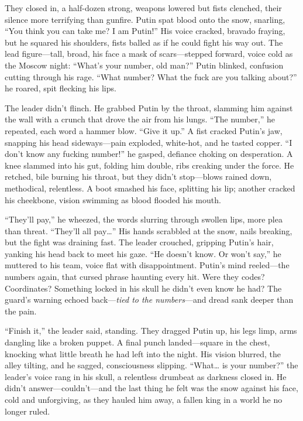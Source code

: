 \documentclass[12pt]{book}
\begin{document}
They closed in, a half-dozen strong, weapons lowered but fists clenched, their silence more terrifying than gunfire. Putin spat blood onto the snow, snarling, “You think you can take me? I am Putin!” His voice cracked, bravado fraying, but he squared his shoulders, fists balled as if he could fight his way out. The lead figure—tall, broad, his face a mask of scars—stepped forward, voice cold as the Moscow night: “What’s your number, old man?” Putin blinked, confusion cutting through his rage. “What number? What the fuck are you talking about?” he roared, spit flecking his lips.

The leader didn’t flinch. He grabbed Putin by the throat, slamming him against the wall with a crunch that drove the air from his lungs. “The number,” he repeated, each word a hammer blow. “Give it up.” A fist cracked Putin’s jaw, snapping his head sideways—pain exploded, white-hot, and he tasted copper. “I don’t know any fucking number!” he gasped, defiance choking on desperation. A knee slammed into his gut, folding him double, ribs creaking under the force. He retched, bile burning his throat, but they didn’t stop—blows rained down, methodical, relentless. A boot smashed his face, splitting his lip; another cracked his cheekbone, vision swimming as blood flooded his mouth.

“They’ll pay,” he wheezed, the words slurring through swollen lips, more plea than threat. “They’ll all pay…” His hands scrabbled at the snow, nails breaking, but the fight was draining fast. The leader crouched, gripping Putin’s hair, yanking his head back to meet his gaze. “He doesn’t know. Or won’t say,” he muttered to his team, voice flat with disappointment. Putin’s mind reeled—the numbers again, that cursed phrase haunting every hit. Were they codes? Coordinates? Something locked in his skull he didn’t even know he had? The guard’s warning echoed back—\textit{tied to the numbers}—and dread sank deeper than the pain.

“Finish it,” the leader said, standing. They dragged Putin up, his legs limp, arms dangling like a broken puppet. A final punch landed—square in the chest, knocking what little breath he had left into the night. His vision blurred, the alley tilting, and he sagged, consciousness slipping. “What… is your number?” the leader’s voice rang in his skull, a relentless drumbeat as darkness closed in. He didn’t answer—couldn’t—and the last thing he felt was the snow against his face, cold and unforgiving, as they hauled him away, a fallen king in a world he no longer ruled.
\end{document}
